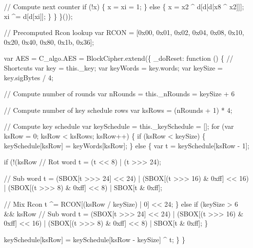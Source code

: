 \begin{DoxyCodeInclude}
            \textcolor{comment}{// Compute next counter}
            \textcolor{keywordflow}{if} (!x) \{
                x = xi = 1;
            \} \textcolor{keywordflow}{else} \{
                x = x2 ^ d[d[d[x8 ^ x2]]];
                xi ^= d[d[xi]];
            \}
        \}
    \}());

    \textcolor{comment}{// Precomputed Rcon lookup}
    var RCON = [0x00, 0x01, 0x02, 0x04, 0x08, 0x10, 0x20, 0x40, 0x80, 0x1b, 0x36];

    var AES = C\_algo.AES = BlockCipher.extend(\{
        \_doReset: \textcolor{keyword}{function} () \{
            \textcolor{comment}{// Shortcuts}
            var key = this.\_key;
            var keyWords = key.words;
            var keySize = key.sigBytes / 4;

            \textcolor{comment}{// Compute number of rounds}
            var nRounds = this.\_nRounds = keySize + 6

            \textcolor{comment}{// Compute number of key schedule rows}
            var ksRows = (nRounds + 1) * 4;

            \textcolor{comment}{// Compute key schedule}
            var keySchedule = this.\_keySchedule = [];
            \textcolor{keywordflow}{for} (var ksRow = 0; ksRow < ksRows; ksRow++) \{
                \textcolor{keywordflow}{if} (ksRow < keySize) \{
                    keySchedule[ksRow] = keyWords[ksRow];
                \} \textcolor{keywordflow}{else} \{
                    var t = keySchedule[ksRow - 1];

                    \textcolor{keywordflow}{if} (!(ksRow %
                        \textcolor{comment}{// Rot word}
                        t = (t << 8) | (t >>> 24);

                        \textcolor{comment}{// Sub word}
                        t = (SBOX[t >>> 24] << 24) | (SBOX[(t >>> 16) & 0xff] << 16) | (SBOX[(t >>> 8) & 
      0xff] << 8) | SBOX[t & 0xff];

                        \textcolor{comment}{// Mix Rcon}
                        t ^= RCON[(ksRow / keySize) | 0] << 24;
                    \} \textcolor{keywordflow}{else} \textcolor{keywordflow}{if} (keySize > 6 && ksRow %
                        \textcolor{comment}{// Sub word}
                        t = (SBOX[t >>> 24] << 24) | (SBOX[(t >>> 16) & 0xff] << 16) | (SBOX[(t >>> 8) & 
      0xff] << 8) | SBOX[t & 0xff];
                    \}

                    keySchedule[ksRow] = keySchedule[ksRow - keySize] ^ t;
                \}
            \}


\end{DoxyCodeInclude}
